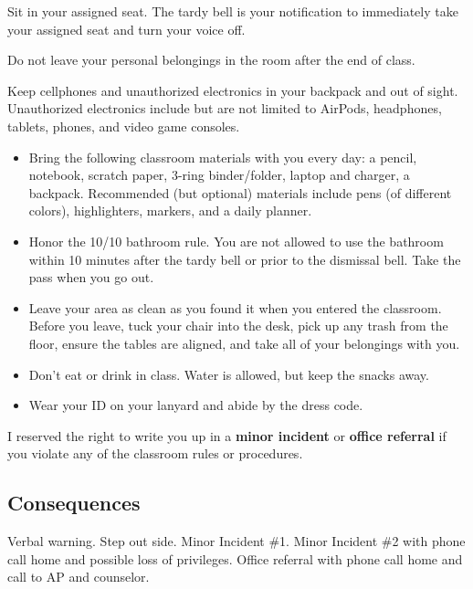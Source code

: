 \documentclass{article}
\begin{document}
\begin{regla}
    Sit in your assigned seat. The tardy bell is your notification to immediately take your assigned seat and turn your voice off.
\end{regla}

\begin{regla}
    Do not leave your personal belongings in the room after the end of class.
\end{regla}

\begin{regla}
    Keep cellphones and unauthorized electronics in your backpack and out of sight. Unauthorized electronics include but are not limited to AirPods, headphones, tablets, phones, and video game consoles.
\end{regla}



\begin{itemize}
\setlength\itemsep{0.1ex}
    \item Bring the following classroom materials with you every day: a pencil, notebook, scratch paper, 3-ring binder/folder, laptop and charger, a backpack. Recommended (but optional) materials include pens (of different colors), highlighters, markers, and a daily planner. 
    \item Honor the 10/10 bathroom rule. You are not allowed to use the bathroom within 10 minutes after the tardy bell or prior to the dismissal bell. Take the pass when you go out.
    \item Leave your area as clean as you found it when you entered the classroom. Before you leave, tuck your chair into the desk, pick up any trash from the floor, ensure the tables are aligned, and take all of your belongings with you.
    \item Don't eat or drink in class. Water is allowed, but keep the snacks away.

    \item Wear your ID on your lanyard and abide by the dress code.
\end{itemize}

I reserved the right to write you up in a \textbf{minor incident} or \textbf{office referral} if you violate any of the classroom rules or procedures. 

\subsection{Consequences}

Verbal warning. Step out side. Minor Incident \#1. Minor Incident \#2 with phone call home and possible loss of privileges. Office referral with phone call home and call to AP and counselor.
\end{document}
